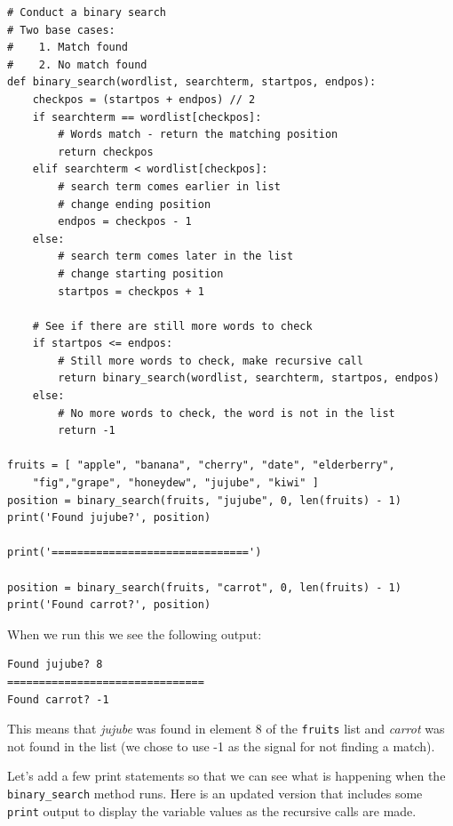\beforeverb
\begin{verbatim}
# Conduct a binary search
# Two base cases:
#    1. Match found
#    2. No match found
def binary_search(wordlist, searchterm, startpos, endpos):
    checkpos = (startpos + endpos) // 2
    if searchterm == wordlist[checkpos]:
        # Words match - return the matching position
        return checkpos
    elif searchterm < wordlist[checkpos]:
        # search term comes earlier in list
        # change ending position
        endpos = checkpos - 1
    else:
        # search term comes later in the list
        # change starting position
        startpos = checkpos + 1

    # See if there are still more words to check
    if startpos <= endpos:
        # Still more words to check, make recursive call
        return binary_search(wordlist, searchterm, startpos, endpos)
    else:
        # No more words to check, the word is not in the list
        return -1

fruits = [ "apple", "banana", "cherry", "date", "elderberry",
    "fig","grape", "honeydew", "jujube", "kiwi" ]
position = binary_search(fruits, "jujube", 0, len(fruits) - 1)
print('Found jujube?', position)
    
print('===============================')

position = binary_search(fruits, "carrot", 0, len(fruits) - 1)
print('Found carrot?', position)
\end{verbatim}
\afterverb

When we run this we see the following output:

\beforeverb
\begin{verbatim}
Found jujube? 8
===============================
Found carrot? -1
\end{verbatim}
\afterverb

This means that \textit{jujube} was found in element 8 of the \texttt{fruits} list and \textit{carrot} was not found in the list (we chose to use -1 as the signal for not finding a match).

Let's add a few print statements so that we can see what is happening when the \texttt{binary\_search} method runs. Here is an updated version that includes some \texttt{print} output to display the variable values as the recursive calls are made. 


